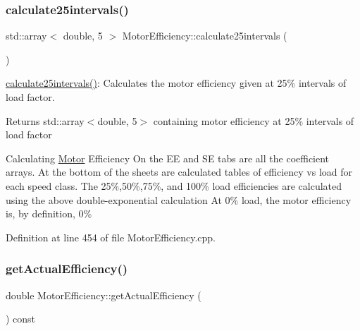 \mbox{\label{class_motor_efficiency_a4135d26efe506365d9ecb7c15f43f35d}} 
\subsubsection{\texorpdfstring{calculate25intervals()}{calculate25intervals()}}
{\footnotesize\ttfamily std\+::array$<$ double, 5 $>$ Motor\+Efficiency\+::calculate25intervals (\begin{DoxyParamCaption}{ }\end{DoxyParamCaption})}

\hyperlink{class_motor_efficiency_a4135d26efe506365d9ecb7c15f43f35d}{calculate25intervals()}\+: Calculates the motor efficiency given at 25\% intervals of load factor. \begin{DoxyReturn}{Returns}
std\+::array$<$double, 5$>$ containing motor efficiency at 25\% intervals of load factor 
\end{DoxyReturn}
Calculating \hyperlink{class_motor}{Motor} Efficiency On the EE and SE tabs are all the coefficient arrays. At the bottom of the sheets are calculated tables of efficiency vs load for each speed class. The 25\%,50\%,75\%, and 100\% load efficiencies are calculated using the above double-\/exponential calculation At 0\% load, the motor efficiency is, by definition, 0\%

Definition at line 454 of file Motor\+Efficiency.\+cpp.

\mbox{\label{class_motor_efficiency_ae40031307b8631cf40df1c4069069dc0}} 
\subsubsection{\texorpdfstring{get\+Actual\+Efficiency()}{getActualEfficiency()}}
{\footnotesize\ttfamily double Motor\+Efficiency\+::get\+Actual\+Efficiency (\begin{DoxyParamCaption}{ }\end{DoxyParamCaption}) const\hspace{0.3cm}{\ttfamily [inline]}}

